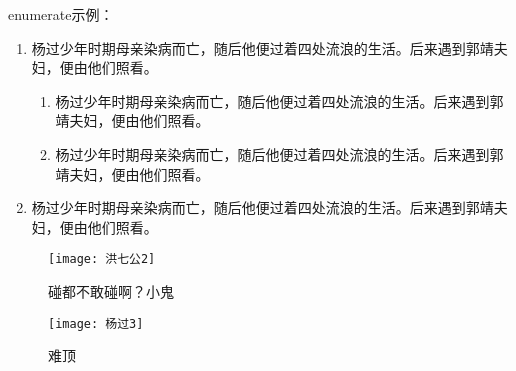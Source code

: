 \documentclass[print, doctor, vlined]{DissertUESTC}
\begin{document}
	\null

	enumerate示例：

	\begin{enumerate}
		\item 杨过少年时期母亲染病而亡，随后他便过着四处流浪的生活。后来遇到郭靖夫妇，便由他们照看。
		\begin{enumerate}
			\item 杨过少年时期母亲染病而亡，随后他便过着四处流浪的生活。后来遇到郭靖夫妇，便由他们照看。
			\item 杨过少年时期母亲染病而亡，随后他便过着四处流浪的生活。后来遇到郭靖夫妇，便由他们照看。
		\end{enumerate}
		\item 杨过少年时期母亲染病而亡，随后他便过着四处流浪的生活。后来遇到郭靖夫妇，便由他们照看。
	\end{enumerate}
	

	\begin{figure}[!htb]
		\centering
		\texttt{[image: 洪七公2]}
		\captionsetup{list=no}%
		\caption{碰都不敢碰啊？小鬼}
	\end{figure}
	
	\begin{figure}[!htb]
		\centering
		\texttt{[image: 杨过3]}
		\captionsetup{list=no}%
		\caption{难顶}
	\end{figure}
\end{document}
